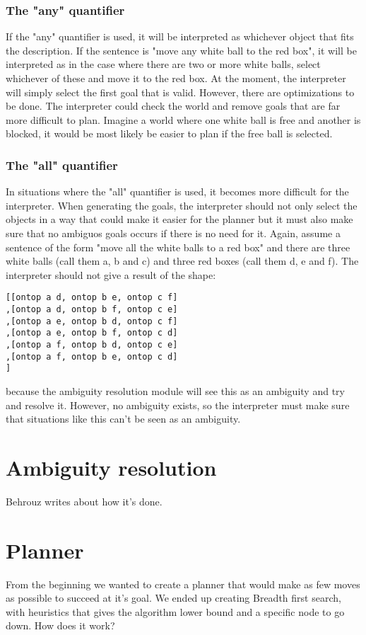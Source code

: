 \documentclass[11pt]{article}
\begin{document}
\subsubsection{The "any" quantifier}
If the "any" quantifier is used, it will be interpreted as whichever object that fits the description. If the sentence is "move any white ball to the red box", it will be interpreted as in the case where there are two or more white balls, select whichever of these and move it to the red box. At the moment, the interpreter will simply select the first goal that is valid. However, there are optimizations to be done. The interpreter could check the world and remove goals that are far more difficult to plan. Imagine a world where one white ball is free and another is blocked, it would be most likely be easier to plan if the free ball is selected.

\subsubsection{The "all" quantifier}
In situations where the "all" quantifier is used, it becomes more difficult for the interpreter. When generating the goals, the interpreter should not only select the objects in a way that could make it easier for the planner but it must also make sure that no ambiguos goals occurs if there is no need for it. Again, assume a sentence of the form "move all the white balls to a red box" and there are three white balls (call them a, b and c) and three red boxes (call them d, e and f). The interpreter should not give a result of the shape:
\begin{verbatim}
[[ontop a d, ontop b e, ontop c f]
,[ontop a d, ontop b f, ontop c e]
,[ontop a e, ontop b d, ontop c f]
,[ontop a e, ontop b f, ontop c d]
,[ontop a f, ontop b d, ontop c e]
,[ontop a f, ontop b e, ontop c d]
]
\end{verbatim}
because the ambiguity resolution module will see this as an ambiguity and try and resolve it. However, no ambiguity exists, so the interpreter must make sure that situations like this can't be seen as an ambiguity.


\section{Ambiguity resolution}
Behrouz writes about how it's done.

\section{Planner}
From the beginning we wanted to create a planner that would make as few moves as possible to succeed at it's goal. We ended up creating Breadth first search, with heuristics that gives the algorithm lower bound and a specific node to go down. How does it work?
\end{document}
